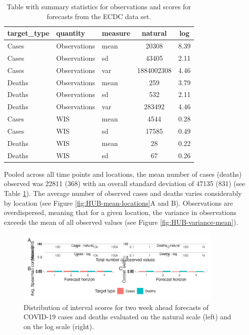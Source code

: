 \documentclass{article}
\begin{document}
\begin{table}[h!]
    \centering
    
    \begin{tabular}{lllcc}
    \toprule
    target\_type & quantity & measure & natural & log\\
    \midrule
    Cases & Observations & mean & 20308 & 8.39\\
    Cases & Observations & sd & 43405 & 2.11\\
    Cases & Observations & var & 1884002308 & 4.46\\
    \addlinespace
    Deaths & Observations & mean & 259 & 3.79\\
    Deaths & Observations & sd & 532 & 2.11\\
    Deaths & Observations & var & 283492 & 4.46\\
    \addlinespace
    \hline
    \addlinespace
    Cases & WIS & mean & 4544 & 0.28\\
    Cases & WIS & sd & 17585 & 0.49\\
    \addlinespace
    Deaths & WIS & mean & 28 & 0.22\\
    Deaths & WIS & sd & 67 & 0.26\\
    \bottomrule
    \end{tabular}
    
    \caption{Table with summary statistics for observations and scores for forecasts from the ECDC data set.}
    \label{tab:HUB-summary}
\end{table}

Pooled across all time points and locations, the mean number of cases (deaths) observed was 22811 (368) with an overall standard deviation of 47135 (831) (see Table \ref{tab:HUB-summary}). The average number of observed cases and deaths varies considerably by location (see Figure \ref{fig:HUB-mean-locations}A and B). Observations are overdispersed, meaning that for a given location, the variance in observations exceeds the mean of all observed values (see Figure \ref{fig:HUB-variance-mean}). 

\begin{figure}[h!]
    \centering
    \includegraphics[width=0.9\textwidth]{output/figures/HUB-average-scores.png}
    \caption{Distribution of interval scores for two week ahead forecasts of COVID-19 cases and deaths evaluated on the natural scale (left) and on the log scale (right). }
    \label{fig:HUB-average-scores}
\end{figure}
\end{document}
